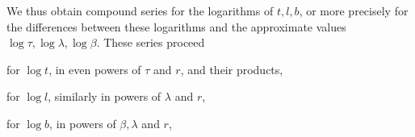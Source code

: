 \indent We thus obtain compound series for the logarithms of \(t,l,b\), or more precisely for the differences between these logarithms and the approximate values \(\log\tau,\log\lambda,\log\beta\). These series proceed
\begin{list}{}{\setlength{\leftmargin}{1.4em}\setlength{\itemindent}{0pt}\setlength{\itemsep}{0pt}\setlength{\parsep}{0pt}}
\item for \(\log t\), in even powers of \(\tau\) and \(r\), and their products,
\item for \(\log l\), similarly in powers of \(\lambda\) and \(r\),
\item for \(\log b\), in powers of \(\beta,\lambda\) and \(r\),
\end{list}
